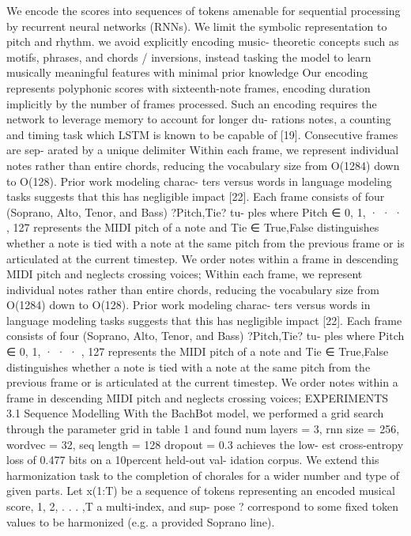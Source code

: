 We encode the scores into sequences of tokens amenable for sequential processing by recurrent neural networks (RNNs). We limit the symbolic representation to pitch and rhythm. we avoid explicitly encoding music- theoretic concepts such as motifs, phrases, and chords / inversions, instead tasking the model to learn musically meaningful features with minimal prior knowledge
Our encoding represents polyphonic scores with sixteenth-note frames, encoding duration implicitly by the number of frames processed. Such an encoding requires the network to leverage memory to account for longer du- rations notes, a counting and timing task which LSTM is known to be capable of [19]. Consecutive frames are sep- arated by a unique delimiter
Within each frame, we represent individual notes rather than entire chords, reducing the vocabulary size from O(1284) down to O(128). Prior work modeling charac- ters versus words in language modeling tasks suggests that this has negligible impact [22]. Each frame consists of
four (Soprano, Alto, Tenor, and Bass) ?Pitch,Tie? tu- ples where Pitch ∈ {0, 1, · · · , 127} represents the MIDI pitch of a note and Tie ∈ {True,False} distinguishes whether a note is tied with a note at the same pitch from the previous frame or is articulated at the current timestep. We order notes within a frame in descending MIDI pitch and neglects crossing voices;
Within each frame, we represent individual notes rather
than entire chords, reducing the vocabulary size from O(1284) down to O(128). Prior work modeling charac- ters versus words in language modeling tasks suggests that this has negligible impact [22]. Each frame consists of
four (Soprano, Alto, Tenor, and Bass) ?Pitch,Tie? tu- ples where Pitch ∈ {0, 1, · · · , 127} represents the MIDI pitch of a note and Tie ∈ {True,False} distinguishes whether a note is tied with a note at the same pitch from the
previous frame or is articulated at the current timestep. We order notes within a frame in descending MIDI pitch and neglects crossing voices;
EXPERIMENTS 3.1 Sequence Modelling
With the BachBot model, we performed a grid search through the parameter grid in table 1 and found num layers = 3, rnn size = 256, wordvec = 32, seq length = 128 dropout = 0.3 achieves the low- est cross-entropy loss of 0.477 bits on a 10percent held-out val- idation corpus.
We extend this harmonization task to the completion of chorales for a wider number and type of given parts. Let
x(1:T) be a sequence of tokens representing an encoded musical score, {1, 2, . . . ,T} a multi-index, and sup- pose ? correspond to some fixed token values to be harmonized (e.g. a provided Soprano line). 
